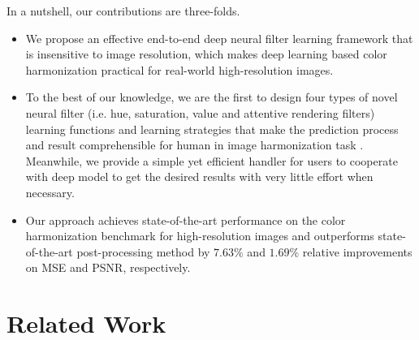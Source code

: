 \documentclass[runningheads]{llncs}
\begin{document}
    In a nutshell, our contributions are three-folds.
    \begin{itemize}[noitemsep,topsep=0pt]
\item
        We propose an effective end-to-end deep neural filter learning framework that is insensitive to image resolution, which makes deep learning based color harmonization practical for real-world high-resolution images.
        
        \item
        To the best of our knowledge,  we are the first to design four types of novel neural filter (i.e. hue, saturation, value and attentive rendering filters) learning functions and learning strategies that make the prediction process and result comprehensible for human in image harmonization task .
        Meanwhile, we provide a simple yet efficient handler for users to cooperate with deep model to get the desired results with very little effort when necessary.
        
        \item Our approach achieves state-of-the-art performance on the color harmonization benchmark for high-resolution images and outperforms state-of-the-art post-processing method by $7.63\%$ and $1.69\%$ relative improvements on MSE and PSNR, respectively.
    \end{itemize}
    
    




    \section{Related Work}
    
\end{document}
